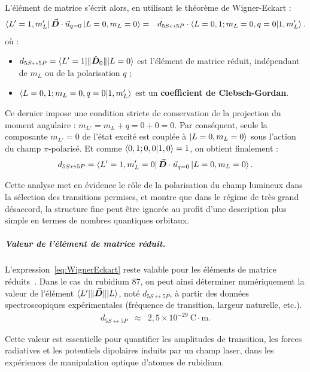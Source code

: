 L’élément de matrice s’écrit alors, en utilisant le théorème de Wigner-Eckart :
\begin{eqnarray}
\bra{L' = 1, m_L'} \vec{{\bm{D}}} \cdot \vec{u}_{q=0} \ket{L = 0, m_L = 0}
& = & d_{\scriptstyle 5S \leftrightarrow 5P} \cdot \braket{L=0, 1; m_L = 0, q=0 | 1, m_L' }.
\end{eqnarray}
où :
\begin{itemize}[label = $\bullet$]
	\item $d_{\scriptstyle 5S \leftrightarrow 5P} = \braket{L' = 1 \vert \Vert \hat{\bm{D}}_0 \Vert \vert L =0 }$  est l’élément de matrice réduit,  indépendant de $m_L$ ou de la polarisation $q$ ;
	\item $\braket{L=0, 1; m_L = 0, q=0 | 1, m_L' }$ est un \textbf{coefficient de Clebsch-Gordan}.
\end{itemize}
Ce dernier impose une condition stricte de conservation de la projection du moment angulaire : $m_{L'} = m_L + q = 0 + 0  = 0 $. Par conséquent, seule la composante $m_{L'} = 0 $  de l’état excité est couplée à $\ket{L = 0 , m_L = 0}$ sous l’action du champ $\pi$-polarisé. Et comme $\braket{0,1;0,0|1,0}=1$, on obtient finalement :
\begin{eqnarray}
 d_{\scriptstyle 5S \leftrightarrow 5P} = \bra{L' = 1, m_L'=0} \vec{{\bm{D}}} \cdot \vec{u}_{q=0} \ket{L = 0, m_L = 0} .
\end{eqnarray}

Cette analyse met en évidence le rôle de la polarisation du champ lumineux dans la sélection des transitions permises, et montre que dans le régime de très grand désaccord, la structure fine peut être ignorée au profit d’une description plus simple en termes de nombres quantiques orbitaux.


\subparagraph{Valeur de l’élément de matrice réduit.}

L'expression~\eqref{eq:WignerEckart} reste valable pour les éléments de matrice réduits~\cite{CCT_QO}. Dans le cas du rubidium 87, on peut ainsi déterminer numériquement la valeur de l’élément $\bra{L'}\!\|\vec{{\bm{D}}}\|\!\ket{L}$, noté $d_{\scriptstyle 5S \leftrightarrow 5P}$, à partir des données spectroscopiques expérimentales (fréquence de transition, largeur naturelle, etc.).
\begin{eqnarray}
d_{\scriptstyle 5S \leftrightarrow 5P} &\approx& 2{,}5 \times 10^{-29}~\mathrm{C \cdot m}.
\end{eqnarray}

Cette valeur est essentielle pour quantifier les amplitudes de transition, les forces radiatives et les potentiels dipolaires induits par un champ laser, dans les expériences de manipulation optique d’atomes de rubidium.



